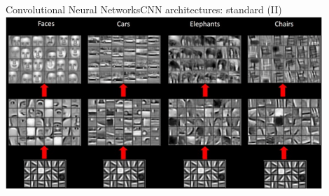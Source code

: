 \documentclass[10pt,compress]{beamer} %
\begin{document}
{\blackSlide
\begin{frame}{Convolutional Neural Networks}{CNN architectures: standard (II)}
	\centering
        \includegraphics[width=0.9\textwidth]{figs/features.png}
\end{frame}
}
\end{document}

